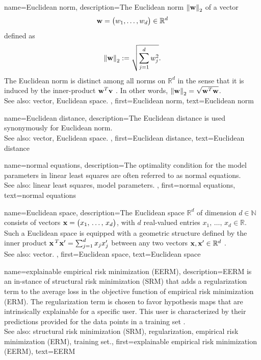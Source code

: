{
{name={Euclidean norm}, 
	description={The 
		Euclidean norm $\mleft\lVert {\bf w} \mright\rVert_{2}$ of a vector 
		$${\bf w} = \big(w_{1},\ldots,w_{d} \big) \in
		\mathbb{R}^{d}$$
		defined as 
		$$\mleft\lVert {\bf w} \mright\rVert_{2} := \sqrt{\sum_{j=1}^{d}w^2_{j}}.$$ 
		The Euclidean norm is distinct among all norms on $\mathbb{R}^{d}$ in the sense 
		that it is induced by the inner-product ${\bf w}^{T} {\bf v}$ \cite{RudinBook,HalmosFiniteDimVecSpace,BoydConvexBook}. 
		In other words, $\mleft\lVert {\bf w} \mright\rVert_{2}= \sqrt{{\bf w}^{T} {\bf w}}$.	\\
		See also: vector, Euclidean space. },
	first={Euclidean norm},
	text={Euclidean norm} 
}

{name={Euclidean distance}, 
	description={The Euclidean distance is used 
	synonymously for Euclidean norm.	\\
	See also: vector, Euclidean space. },
	first={Euclidean distance},
	text={Euclidean distance} 
}

{name={normal equations}, 
	description={The optimality condition for the model parameters 
	in linear least squares are often referred to as normal equations.\\ 
	See also: linear least squares, model parameters. 
	},
	first={normal equations},
	text={normal equations} 
}


{name={Euclidean space}, 
	description={The 
		Euclidean space $\mathbb{R}^{d}$ of dimension $d \in \mathbb{N}$ consists 
		of vectors ${\bf x}= \big(x_{1}, \,\ldots, \,x_{d}\big)$, with $d$ 
		real-valued entries $x_{1}, \,\ldots, \,x_{d} \in \mathbb{R}$. Such a Euclidean 
		space is equipped with a geometric structure defined by the inner product 
		${\bf x}\,^{T} {\bf x}' = \sum_{j=1}^{d} x_{j} x'_{j}$ 
		between any two vectors ${\bf x},{\bf x}' \in \mathbb{R}^{d}$ \cite{RudinBookPrinciplesMatheAnalysis}.
		\\
		See also: vector. },
	first={Euclidean space},
	text={Euclidean space} 
}

{name={explainable empirical risk minimization (EERM)}, 
	description={EERM is an 
		in-\linebreak stance of structural risk minimization (SRM) that adds a regularization term to the 
		average loss in the objective function of empirical risk minimization (ERM). 
		The regularization term is chosen to favor hypothesis maps that are intrinsically 
		explainable for a specific user. This user is characterized by their predictions provided 
		for the data points in a training set \cite{Zhang:2024aa}.
				\\
		See also: structural risk minimization (SRM), regularization, empirical risk minimization (ERM), training set.},
	first={explainable empirical risk minimization (EERM)},
	text={EERM} 
}
	
}
